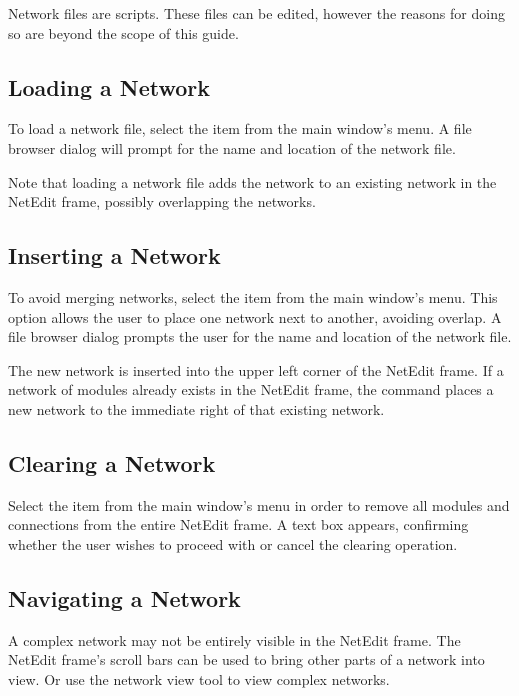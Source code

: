 Network files are   scripts.
These files can be edited, however the reasons for doing so are beyond
the scope of this guide.

\subsection{Loading a Network}
\label{sec:opennet}

To load a network file, select the  item from the main
window's  menu.   A file browser dialog will prompt for the
name and location of the network file.

Note that loading a network file adds the network to an existing network in
the NetEdit frame, possibly overlapping the networks.

\subsection{Inserting a Network}
\label{sec:insertnetwork}

To avoid merging networks, select the
 item from the main window's  menu. This
option allows the user to place one \sr{} network next to another,
avoiding overlap.  A file browser dialog prompts the user for the name and
location of the network file.

The new network is inserted into the upper left corner of the
NetEdit frame.  If a network of modules already exists in the NetEdit
frame, the  command places a new network to the
immediate right of that existing network.

\subsection{Clearing a Network}
\label{sec:clearnetwork}

Select the  item from the main window's 
menu in order to remove all modules and connections from the entire
NetEdit frame.  A text box appears, confirming whether the user wishes
to proceed with or cancel the clearing operation.

\subsection{Navigating a Network}
\label{sec:navnetwork}

A complex network may not be entirely visible in the NetEdit frame.
The NetEdit frame's scroll bars can be used to bring other parts of a network into
view.  Or use the network view tool to view complex networks.

